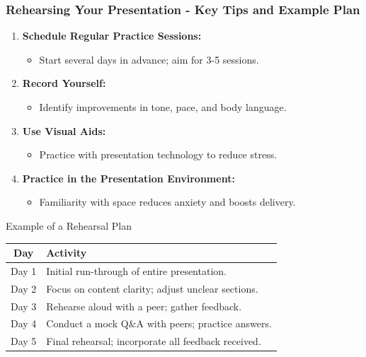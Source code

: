 \documentclass{beamer}
\begin{document}
\begin{frame}[fragile]
    \frametitle{Rehearsing Your Presentation - Key Tips and Example Plan}
    \begin{enumerate}
        \item \textbf{Schedule Regular Practice Sessions:}
        \begin{itemize}
            \item Start several days in advance; aim for 3-5 sessions.
        \end{itemize}

        \item \textbf{Record Yourself:}
        \begin{itemize}
            \item Identify improvements in tone, pace, and body language.
        \end{itemize}

        \item \textbf{Use Visual Aids:}
        \begin{itemize}
            \item Practice with presentation technology to reduce stress.
        \end{itemize}
        
        \item \textbf{Practice in the Presentation Environment:}
        \begin{itemize}
            \item Familiarity with space reduces anxiety and boosts delivery.
        \end{itemize}
    \end{enumerate}

    \begin{block}{Example of a Rehearsal Plan}
        \begin{tabular}{|c|l|}
            \hline
            \textbf{Day} & \textbf{Activity} \\
            \hline
            Day 1 & Initial run-through of entire presentation. \\
            Day 2 & Focus on content clarity; adjust unclear sections. \\
            Day 3 & Rehearse aloud with a peer; gather feedback. \\
            Day 4 & Conduct a mock Q\&A with peers; practice answers. \\
            Day 5 & Final rehearsal; incorporate all feedback received. \\
            \hline
        \end{tabular}
    \end{block}
\end{frame}
\end{document}

